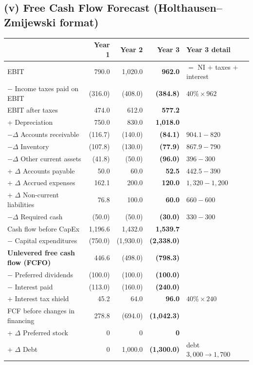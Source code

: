 \subsection{(v) Free Cash Flow Forecast (Holthausen--Zmijewski format)}
\begin{center}
\footnotesize\setlength{\tabcolsep}{3.5pt}
\begin{tabular}{@{}lrr>{\bfseries}rl@{}}
\toprule
 & \textbf{Year 1} & \textbf{Year 2} & \textbf{Year 3} & \textbf{Year 3 detail}\\
\midrule
EBIT & 790.0 & 1,020.0 & 962.0 & $=$ NI $+$ taxes $+$ interest\\
$-$ Income taxes paid on EBIT & (316.0) & (408.0) & (384.8) & $40\%\times962$\\
EBIT after taxes & 474.0 & 612.0 & 577.2 & \\
+ Depreciation & 750.0 & 830.0 & 1,018.0 & \\
$-\Delta$ Accounts receivable & (116.7) & (140.0) & (84.1) & $904.1-820$\\
$-\Delta$ Inventory & (107.8) & (130.0) & (77.9) & $867.9-790$\\
$-\Delta$ Other current assets & (41.8) & (50.0) & (96.0) & $396-300$\\
+ $\Delta$ Accounts payable & 50.0 & 60.0 & 52.5 & $442.5-390$\\
+ $\Delta$ Accrued expenses & 162.1 & 200.0 & 120.0 & $1{,}320-1{,}200$\\
+ $\Delta$ Non-current liabilities & 76.8 & 100.0 & 60.0 & $660-600$\\
$-\Delta$ Required cash & (50.0) & (50.0) & (30.0) & $330-300$\\
Cash flow before CapEx & 1,196.6 & 1,432.0 & 1,539.7 & \\
$-$ Capital expenditures & (750.0) & (1,930.0) & (2,338.0) & \\
\textbf{Unlevered free cash flow (FCFO)} & 446.6 & (498.0) & (798.3) & \\
\midrule
$-$ Preferred dividends & (100.0) & (100.0) & (100.0) & \\
$-$ Interest paid & (113.0) & (160.0) & (240.0) & \\
+ Interest tax shield & 45.2 & 64.0 & 96.0 & $40\%\times240$\\
FCF before changes in financing & 278.8 & (694.0) & (1,042.3) & \\
+ $\Delta$ Preferred stock & 0 & 0 & 0 & \\
+ $\Delta$ Debt & 0 & 1,000.0 & (1,300.0) & debt $3{,}000\to1{,}700$\\

\end{tabular}
\end{center}
